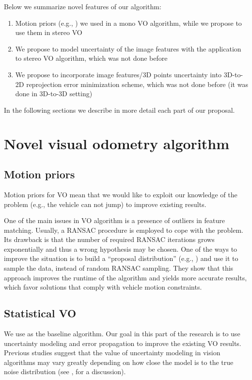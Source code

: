 \documentclass[10pt]{article}         %
\begin{document}
Below we summarize novel features of our algorithm:
\begin{enumerate}
\item Motion priors (e.g., \cite{scaramuzza2011exploiting}) we used in a mono VO algorithm, while we propose to use them in stereo VO
\item We propose to model uncertainty of the image features with the application to stereo VO algorithm, which was not done before
\item We propose to incorporate image features/3D points uncertainty into 3D-to-2D reprojection error minimization scheme, which was not done before (it was done in 3D-to-3D setting)
\end{enumerate}
In the following sections we describe in more detail each part of our proposal.

\section{Novel visual odometry algorithm}\label{sect:algorithm}
\subsection{Motion priors}
Motion priors for VO mean that we would like to exploit our knowledge of the problem (e.g., the vehicle can not jump) to improve existing results.

One of the main issues in VO algorithm is a presence of outliers in feature matching.  Usually, a RANSAC procedure is employed to cope with the problem.  Its drawback is that the number of required RANSAC iterations grows exponentially and thus a wrong hypothesis may be chosen.  One of the ways to improve the situation is to build a ``proposal distribution'' (e.g., \cite{scaramuzza2011exploiting}) and use it to sample the data, instead of random RANSAC sampling.  They show that this approach improves the runtime of the algorithm and yields more accurate results, which favor solutions that comply with vehicle motion constraints.

\subsection{Statistical VO}

We use \cite{Geiger2012CVPR} as the baseline algorithm. Our goal in this part of the research is to use uncertainty modeling and error propagation to improve the existing VO results. Previous studies suggest that the value of uncertainty modeling in vision algorithms may vary greatly depending on how close the model is to the true noise distribution (see  \cite{brooks2001value}, \cite{kanazawa2001we} for a discussion).
\end{document}
